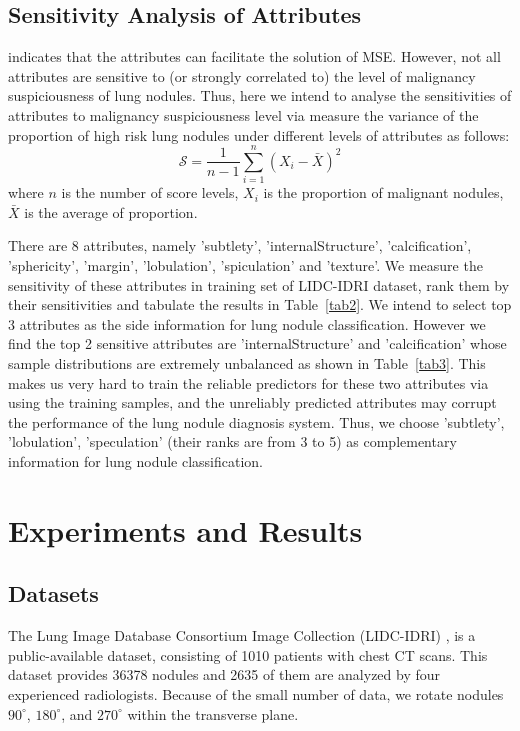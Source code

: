 \documentclass{article}
\begin{document}
\subsection{Sensitivity Analysis of Attributes}
\label{select}
\vspace{-0.1cm}
\cite{Hussein2017Risk} indicates that the attributes can facilitate the solution of MSE. However, not all attributes are sensitive to (or strongly correlated to) the level of malignancy suspiciousness of lung nodules. Thus, here we intend to analyse the sensitivities of attributes to malignancy suspiciousness level via measure the variance of the proportion of high risk lung nodules under different levels of attributes as follows:
\begin{equation}
\mathcal{S} = \frac{1}{n-1}\sum_{i=1}^n (X_i - \bar{X})^{2}
\end{equation}
where $n$ is the number of score levels,  $X_i$ is the proportion of malignant nodules, $\bar{X}$ is the average of proportion.

There are 8 attributes, namely 'subtlety', 'internalStructure', 'calcification', 'sphericity', 'margin', 'lobulation', 'spiculation' and 'texture'.
We measure the sensitivity of these attributes in training set of LIDC-IDRI dataset, rank them by their sensitivities and tabulate the results in Table~\ref{tab2}. We intend to select top 3 attributes as the side information for lung nodule classification. However we find the top 2 sensitive attributes are 'internalStructure' and 'calcification' whose sample distributions are extremely unbalanced as shown in Table~\ref{tab3}.  This makes us very hard to train the reliable predictors for these two attributes via using the training samples, and the unreliably predicted attributes may corrupt the performance of the lung nodule diagnosis system. Thus, we choose 'subtlety', 'lobulation', 'speculation' (their ranks are from 3 to 5) as complementary information for lung nodule classification.

\vspace{-0.3cm}
\section{Experiments and Results}
\label{exp}
\vspace{-0.2cm}
\subsection{Datasets}
\label{sec:format}
\vspace{-0.2cm}
The Lung Image Database Consortium Image Collection (LIDC-IDRI) \cite{Armato2010WE}, is a public-available dataset, consisting of 1010 patients with chest CT scans. This dataset provides 36378 nodules and 2635 of them are analyzed by four experienced radiologists. Because of the small number of data, we rotate nodules $90^{\circ}$, $180^{\circ}$, and $270^{\circ}$ within the transverse plane.
\end{document}
